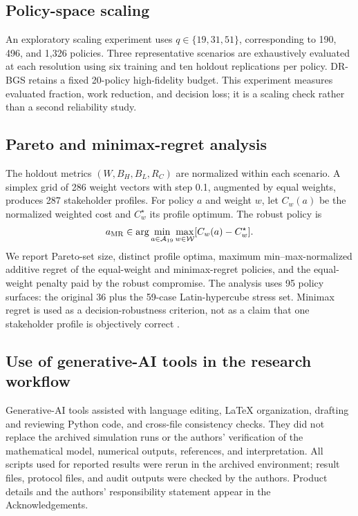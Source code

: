\documentclass[preprint,12pt]{elsarticle}
\newcommand{\Aset}{\mathcal{A}}
\begin{document}
\subsection{Policy-space scaling}

An exploratory scaling experiment uses $q\in\{19,31,51\}$, corresponding to 190, 496, and 1,326 policies. Three representative scenarios are exhaustively evaluated at each resolution using six training and ten holdout replications per policy. DR-BGS retains a fixed 20-policy high-fidelity budget. This experiment measures evaluated fraction, work reduction, and decision loss; it is a scaling check rather than a second reliability study.

\subsection{Pareto and minimax-regret analysis}

The holdout metrics $(W,B_H,B_L,R_C)$ are normalized within each scenario. A simplex grid of 286 weight vectors with step 0.1, augmented by equal weights, produces 287 stakeholder profiles. For policy $a$ and weight $w$, let $C_w(a)$ be the normalized weighted cost and $C_w^\star$ its profile optimum. The robust policy is
\[
a_{\rm MR}\in\arg\min_{a\in\Aset_{19}}
\max_{w\in\mathcal W}[C_w(a)-C_w^\star].
\]
We report Pareto-set size, distinct profile optima, maximum min--max-normalized additive regret of the equal-weight and minimax-regret policies, and the equal-weight penalty paid by the robust compromise. The analysis uses 95 policy surfaces: the original 36 plus the 59-case Latin-hypercube stress set. Minimax regret is used as a decision-robustness criterion, not as a claim that one stakeholder profile is objectively correct \cite{groetzner2022regret}.

\subsection{Use of generative-AI tools in the research workflow}
Generative-AI tools assisted with language editing, LaTeX organization, drafting and reviewing Python code, and cross-file consistency checks. They did not replace the archived simulation runs or the authors' verification of the mathematical model, numerical outputs, references, and interpretation. All scripts used for reported results were rerun in the archived environment; result files, protocol files, and audit outputs were checked by the authors. Product details and the authors' responsibility statement appear in the Acknowledgements.
\end{document}
